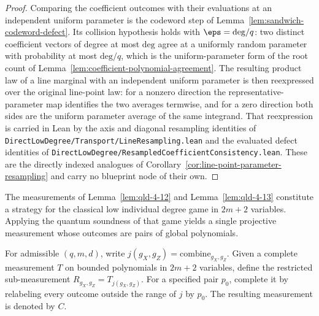 \begin{proof}
	\leanok
	Comparing the coefficient outcomes with their evaluations at an independent
	uniform parameter is the codeword step of
	Lemma~\ref{lem:sandwich-codeword-defect}. Its collision hypothesis holds
	with $\eps = \mathrm{deg}/q$: two distinct coefficient vectors of degree at
	most $\mathrm{deg}$ agree at a uniformly random parameter with probability
	at most $\mathrm{deg}/q$, which is the uniform-parameter form of the root
	count of Lemma~\ref{lem:coefficient-polynomial-agreement}.
	The resulting product law of a line marginal with an independent uniform
	parameter is then reexpressed over the original line-point law: for a
	nonzero direction the representative-parameter map identifies the two
	averages termwise, and for a zero direction both sides are the uniform
	parameter average of the same integrand. That reexpression is carried in
	Lean by the axis and diagonal resampling identities of
	\texttt{DirectLowDegree/Transport/LineResampling.lean} and the evaluated
	defect identities of
	\texttt{DirectLowDegree/ResampledCoefficientConsistency.lean}. These are
	the directly indexed analogues of
	Corollary~\ref{cor:line-point-parameter-resampling} and carry no blueprint
	node of their own.
\end{proof}

The measurements of Lemma~\ref{lem:qld-4-12} and Lemma~\ref{lem:qld-4-13}
constitute a strategy for the classical low individual degree game in $2m+2$
variables. Applying the quantum soundness of that game yields a single
projective measurement whose outcomes are pairs of global polynomials.

\begin{definition}
	\label{def:qld-pair-restriction-completion}
	\leanok
	For admissible $(q,m,d)$, write
	$j(g_X,g_Z)=\mathrm{combine}_{g_X,g_Z}$. Given a complete measurement
	$T$ on bounded polynomials in $2m+2$ variables, define the restricted
	sub-measurement $R_{g_X,g_Z}=T_{j(g_X,g_Z)}$. For a specified pair $p_0$,
	complete it by relabeling every outcome outside the range of $j$ by $p_0$.
	The resulting measurement is denoted by $C$.
\end{definition}

